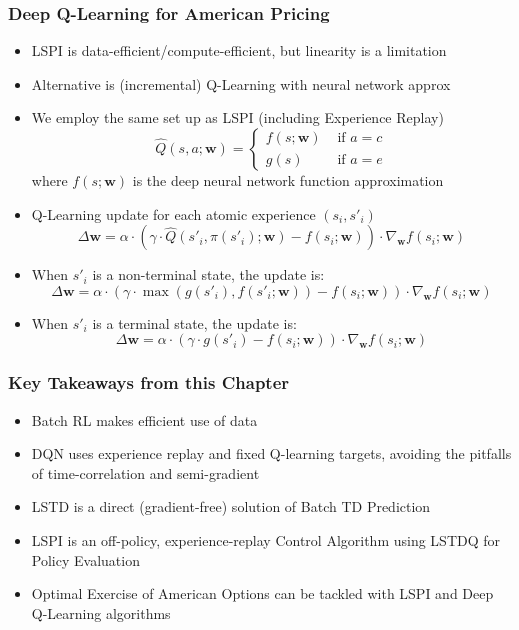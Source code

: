 \documentclass{beamer}
\begin{document}
\begin{frame}
\frametitle{Deep Q-Learning for American Pricing}
\pause
\begin{itemize}[<+->]
\item LSPI is data-efficient/compute-efficient, but linearity is a limitation
\item Alternative is (incremental) Q-Learning with neural network approx
\item We employ the same set up as LSPI (including Experience Replay)
$$
\hat{Q}(s,a; \bm{w}) =
\begin{cases}
f(s;\bm{w}) & \text{ if } a = c \\
g(s) & \text{ if } a = e
\end{cases}
$$
where $f(s; \bm{w})$ is the deep neural network function approximation
\item Q-Learning update for each atomic experience $(s_i,s'_i)$
$$\Delta \bm{w} = \alpha \cdot (\gamma \cdot \hat{Q}(s'_i, \pi(s'_i); \bm{w}) - f(s_i;\bm{w})) \cdot \nabla_{\bm{w}} f(s_i;\bm{w})$$
\item When $s'_i$ is a non-terminal state, the update is:
$$\Delta \bm{w} =  \alpha \cdot (\gamma \cdot \max(g(s'_i), f(s'_i;\bm{w})) - f(s_i;\bm{w})) \cdot \nabla_{\bm{w}} f(s_i;\bm{w})$$
\item When $s'_i$ is a terminal state, the update is:
$$\Delta \bm{w} = \alpha \cdot (\gamma \cdot g(s'_i) - f(s_i;\bm{w})) \cdot \nabla_{\bm{w}} f(s_i;\bm{w})$$
\end{itemize}
\end{frame}

\begin{frame}
\frametitle{Key Takeaways from this Chapter}
\pause
\begin{itemize}[<+->]
\item Batch RL makes efficient use of data
\item DQN uses experience replay and fixed Q-learning targets, avoiding the pitfalls of time-correlation and semi-gradient
\item LSTD is a direct (gradient-free) solution of Batch TD Prediction
\item LSPI is an off-policy, experience-replay Control Algorithm using LSTDQ for Policy Evaluation
\item Optimal Exercise of American Options can be tackled with LSPI and Deep Q-Learning algorithms
\end{itemize}
\end{frame}
\end{document}
